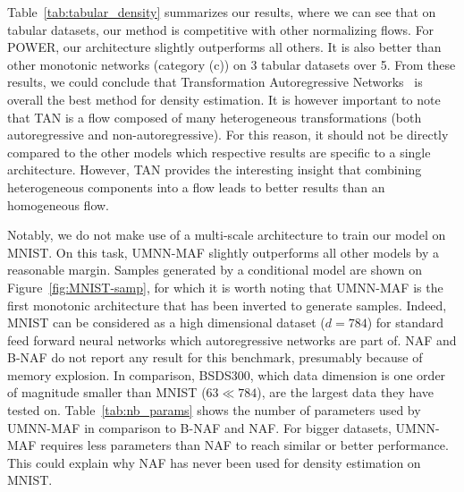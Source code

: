 \documentclass{article}
\begin{document}
Table~\ref{tab:tabular_density} summarizes our results, where we can see that on tabular datasets, our method is competitive with other normalizing flows.
For POWER, our architecture slightly outperforms all others.
It is also better than other monotonic networks (category (c)) on 3 tabular datasets over 5.
From these results, we could conclude that Transformation Autoregressive Networks~\citep[TAN, ][]{TAN} is overall the best method for density estimation.
It is however important to note that TAN is a flow composed of many heterogeneous transformations (both autoregressive and non-autoregressive).
For this reason, it should not be directly compared to the other models which respective results are specific to a single architecture.
However, TAN provides the interesting insight that combining heterogeneous components into a flow leads to better results than an homogeneous flow.

Notably, we do not make use of a multi-scale architecture to train our model on MNIST. On this task,  UMNN-MAF slightly outperforms all other models by a reasonable margin.
Samples generated by a conditional model are shown on Figure~\ref{fig:MNIST-samp}, for which it is worth noting that UMNN-MAF is the first monotonic architecture that has been inverted to generate samples.
Indeed, MNIST can be considered as a high dimensional dataset ($d=784$) for standard feed forward neural networks which autoregressive networks are part of. NAF and B-NAF do not report any result for this benchmark, presumably because of memory explosion.
In comparison, BSDS300, which data dimension is one order of magnitude smaller than MNIST ($63 \ll 784$), are the largest data they have tested on. Table~\ref{tab:nb_params} shows the number of parameters used by UMNN-MAF in comparison to B-NAF and  NAF. For bigger datasets, UMNN-MAF requires less parameters than NAF to reach similar or better performance. This could explain why NAF has never been used for density estimation on MNIST.
\end{document}
